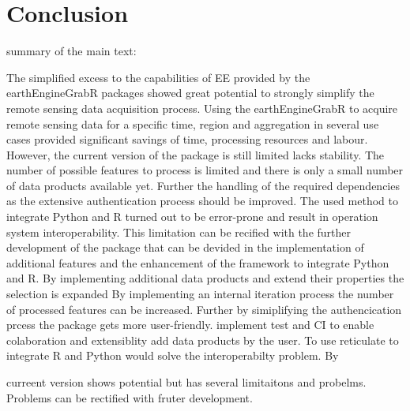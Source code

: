 
\chapter{Conclusion}

summary of the main text:



The simplified excess to the capabilities of EE provided by the earthEngineGrabR packages showed great potential to strongly simplify the remote sensing data acquisition process. Using the earthEngineGrabR to acquire
remote sensing data for a specific time, region and aggregation in several use cases provided significant savings of time, processing resources and labour.
However, the current version of the package is still limited lacks stability. 
The number of possible features to process is limited and there is only a small number of data products available yet. Further the handling of the required dependencies as the extensive authentication process should be improved.
The used method to integrate Python and R turned out to be error-prone and result in operation system interoperability.
This limitation can be recified with the further development of the package that can be devided in the implementation of additional features and the enhancement of the framework to integrate Python and R.
By implementing additional data products and extend their properties the selection is expanded 
By implementing an internal iteration process the number of processed features can be increased. Further by simiplifying the authencication prcess the package gets more user-friendly. implement test and CI to enable colaboration and extensiblity add data products by the user.
To use reticulate to integrate R and Python would solve the interoperabilty problem. 
By


curreent version shows potential but has several limitaitons and probelms. 
Problems can be rectified with fruter development.



